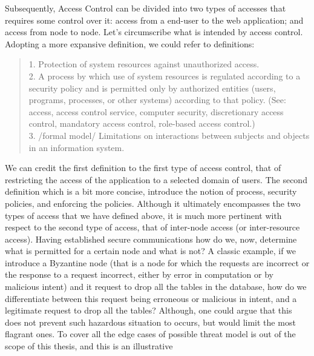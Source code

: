 \documentclass[11pt]{amsart}
\begin{document}
\begin{enumarate}
          Subsequently, Access Control can be divided into two types of accesses that
          requires some control over it: access from a end-user to the web application;
          and access from node to node. Let's circumscribe what is intended by access
          control. Adopting a more expansive definition, we could refer to
          \cite{shirey2009rfc} definitions:
          \begin{quote}
            1. Protection of system resources against unauthorized access.
            \\
            2. A process by which use of system resources is regulated
            according to a security policy and is permitted only by authorized
            entities (users, programs, processes, or other systems) according
            to that policy. (See: access, access control service, computer
            security, discretionary access control, mandatory access control,
            role-based access control.)
            \\
            3. /formal model/ Limitations on interactions between subjects
            and objects in an information system.
          \end{quote}
          We can credit the first definition to the first type of access control, that of
          restricting the access of the application to a selected domain of users. The
          second definition which is a bit more concise, introduce the notion of process,
          security policies, and enforcing the policies. Although it ultimately
          encompasses the two types of access that we have defined above, it is much more
          pertinent with respect to the second type of access, that of inter-node access
          (or inter-resource access). Having established secure communications how do we,
          now, determine what is permitted for a certain node and what is not? A classic
          example, if we introduce a Byzantine node (that is a node for which the requests
          are incorrect or the response to a request incorrect, either by error in
          computation or by malicious intent) and it request to drop all the tables in the
          database, how do we differentiate between this request being erroneous or
          malicious in intent, and a legitimate request to drop all the tables? Although,
          one could argue that this does not prevent such hazardous situation to occurs,
          but would limit the most flagrant ones. To cover all the edge cases of possible
          threat model is out of the scope of this thesis, and this is an illustrative

\end{enumarate}
\end{document}
